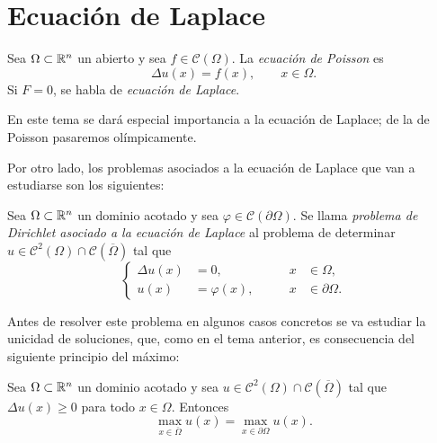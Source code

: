 \documentclass[a4paper, 12pt, extrafontsizes]{memoir}
\begin{document}
\chapter{Ecuación de Laplace}

\begin{definition}
    Sea $\Omega \subset \mathbb R^n$ un abierto y sea $f \in \mathcal{C}(\Omega)$. La \emph{ecuación de Poisson} es
    \[\Delta u(x) = f(x), \qquad x \in \Omega.\]
    Si $F = 0$, se habla de \emph{ecuación de Laplace}.
\end{definition}

En este tema se dará especial importancia a la ecuación de Laplace; de la de Poisson pasaremos olímpicamente. 

Por otro lado, los problemas asociados a la ecuación de Laplace que van a estudiarse son los siguientes:

\begin{definition}
    Sea $\Omega \subset \mathbb R^n$ un dominio acotado y sea $\varphi \in \mathcal{C}(\partial \Omega)$. Se llama \emph{problema de Dirichlet asociado a la ecuación de Laplace} al problema de determinar $u \in \mathcal{C}^2(\Omega) \cap \mathcal{C}(\overline{\Omega})$ tal que
    \[\left\{\begin{alignedat}{3}
        \Delta u(x) &= 0, \qquad & x &\in \Omega, \\
        u(x) &= \varphi(x), \qquad & x &\in \partial \Omega.
    \end{alignedat}\right.\]
\end{definition}

Antes de resolver este problema en algunos casos concretos se va estudiar la unicidad de soluciones, que, como en el tema anterior, es consecuencia del siguiente principio del máximo:

\begin{theorem}
    Sea $\Omega \subset \mathbb R^n$ un dominio acotado y sea $u \in \mathcal{C}^2(\Omega) \cap \mathcal{C}(\overline{\Omega})$ tal que $\Delta u(x) \geq 0$ para todo $x \in \Omega$. Entonces
    \[\max_{x \in \overline{\Omega}} u(x) = \max_{x \in \partial \Omega} u(x).\]
\end{theorem}
\end{document}
